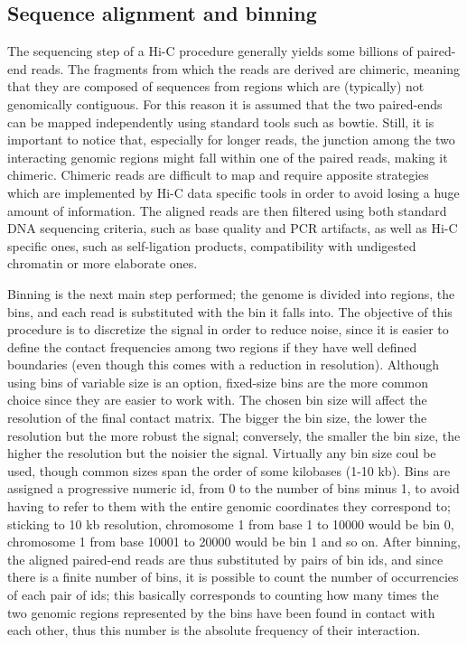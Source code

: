 \subsection{Sequence alignment and binning}
The sequencing step of a Hi-C procedure generally yields some billions of paired-end reads. The fragments from which the reads are derived are chimeric, meaning that they are composed of sequences from regions which are (typically) not genomically contiguous. For this reason it is assumed that the two paired-ends can be mapped independently using standard tools such as bowtie. Still, it is important to notice that, especially for longer reads, the junction among the two interacting genomic regions might fall within one of the paired reads, making it chimeric. Chimeric reads are difficult to map and require apposite strategies which are implemented by Hi-C data specific tools in order to avoid losing a huge amount of information. The aligned reads are then filtered using both standard DNA sequencing criteria, such as base quality and PCR artifacts, as well as Hi-C specific ones, such as self-ligation products, compatibility with undigested chromatin\cite{readfiltering2013} or more elaborate ones\cite{complexfiltering2017}.

Binning is the next main step performed; the genome is divided into regions, the bins, and each read is substituted with the bin it falls into. The objective of this procedure is to discretize the signal in order to reduce noise, since it is easier to define the contact frequencies among two regions if they have well defined boundaries (even though this comes with a reduction in resolution).
Although using bins of variable size is an option, fixed-size bins are the more common choice since they are easier to work with. The chosen bin size will affect the resolution of the final contact matrix. The bigger the bin size, the lower the resolution but the more robust the signal; conversely, the smaller the bin size, the higher the resolution but the noisier the signal. Virtually any bin size coul be used, though common sizes span the order of some kilobases (1-10 kb). Bins are assigned a progressive numeric id, from 0 to the number of bins minus 1, to avoid having to refer to them with the entire genomic coordinates they correspond to; sticking to 10 kb resolution, chromosome 1 from base 1 to 10000 would be bin 0, chromosome 1 from base 10001 to 20000 would be bin 1 and so on. After binning, the aligned paired-end reads are thus substituted by pairs of bin ids, and since there is a finite number of bins, it is possible to count the number of occurrencies of each pair of ids; this basically corresponds to counting how many times the two genomic regions represented by the bins have been found in contact with each other, thus this number is the absolute frequency of their interaction. 

